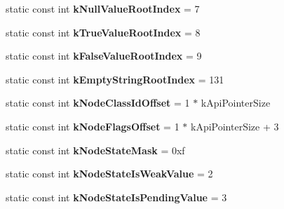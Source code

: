 \begin{DoxyCompactItemize}
\item 
\hypertarget{classv8_1_1internal_1_1_internals_ab311cf753ec5c968052bd83ef21e83f8}{}static const int {\bfseries k\+Null\+Value\+Root\+Index} = 7\label{classv8_1_1internal_1_1_internals_ab311cf753ec5c968052bd83ef21e83f8}

\item 
\hypertarget{classv8_1_1internal_1_1_internals_a93abd58b178eca469bade28e68b5c59e}{}static const int {\bfseries k\+True\+Value\+Root\+Index} = 8\label{classv8_1_1internal_1_1_internals_a93abd58b178eca469bade28e68b5c59e}

\item 
\hypertarget{classv8_1_1internal_1_1_internals_a90b6837aa368bbe4ffd914e6f753b167}{}static const int {\bfseries k\+False\+Value\+Root\+Index} = 9\label{classv8_1_1internal_1_1_internals_a90b6837aa368bbe4ffd914e6f753b167}

\item 
\hypertarget{classv8_1_1internal_1_1_internals_a6f669f3d98fe653b281b26be3bc0655a}{}static const int {\bfseries k\+Empty\+String\+Root\+Index} = 131\label{classv8_1_1internal_1_1_internals_a6f669f3d98fe653b281b26be3bc0655a}

\item 
\hypertarget{classv8_1_1internal_1_1_internals_af4fb6d499cb87f03031ad4d6be6bcd8f}{}static const int {\bfseries k\+Node\+Class\+Id\+Offset} = 1 $\ast$ k\+Api\+Pointer\+Size\label{classv8_1_1internal_1_1_internals_af4fb6d499cb87f03031ad4d6be6bcd8f}

\item 
\hypertarget{classv8_1_1internal_1_1_internals_aee5606f2a44d43d8dafe344e0bb753ef}{}static const int {\bfseries k\+Node\+Flags\+Offset} = 1 $\ast$ k\+Api\+Pointer\+Size + 3\label{classv8_1_1internal_1_1_internals_aee5606f2a44d43d8dafe344e0bb753ef}

\item 
\hypertarget{classv8_1_1internal_1_1_internals_a853acc088978d38a5a69091cf857a46d}{}static const int {\bfseries k\+Node\+State\+Mask} = 0xf\label{classv8_1_1internal_1_1_internals_a853acc088978d38a5a69091cf857a46d}

\item 
\hypertarget{classv8_1_1internal_1_1_internals_a8a5d4cc92a6952c2a50922c77a606e68}{}static const int {\bfseries k\+Node\+State\+Is\+Weak\+Value} = 2\label{classv8_1_1internal_1_1_internals_a8a5d4cc92a6952c2a50922c77a606e68}

\item 
\hypertarget{classv8_1_1internal_1_1_internals_a843b53b17257ecd957eade0d9f21c5ab}{}static const int {\bfseries k\+Node\+State\+Is\+Pending\+Value} = 3\label{classv8_1_1internal_1_1_internals_a843b53b17257ecd957eade0d9f21c5ab}


\end{DoxyCompactItemize}
